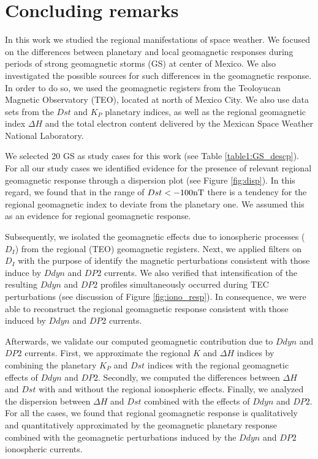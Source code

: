\documentclass[a4paper,fleqn]{cas-dc}
\begin{document}
\section{Concluding remarks}

In this work we studied the regional manifestations of space weather. We focused on the differences between planetary and local geomagnetic responses during periods of strong geomagnetic storms (GS) at center of Mexico. We also investigated the possible sources for such differences in the geomagnetic response. In order to do so, we used the geomagnetic registers from the Teoloyucan Magnetic Observatory (TEO), located at north of Mexico City. We also use data sets from the $Dst$ and $K_P$ planetary indices, as well as the regional geomagnetic index $\Delta H$ and the total electron content delivered by the Mexican Space Weather National Laboratory.

We selected 20 GS as study cases for this work (see Table \ref{table1:GS_descp}). For all our study cases we identified evidence for the presence of relevant regional geomagnetic response through a dispersion plot (see Figure \ref{fig:disp}). In this regard, we found that in the range of $Dst < -100 {\rm nT}$ there is a tendency for the regional geomagnetic index to deviate from the planetary one. We assumed this as an evidence for regional geomagnetic response.

Subsequently, we isolated the geomagnetic effects due to ionospheric processes ($D_I$) from the regional (TEO) geomagnetic registers. Next, we applied filters on $D_I$ with the purpose of identify the magnetic perturbations consistent with those induce by $Ddyn$ and $DP2$ currents. We also verified that intensification of the resulting $Ddyn$ and $DP2$ profiles simultaneously occurred during TEC perturbations (see discussion of Figure \ref{fig:iono_resp}). In consequence, we were able to reconstruct the regional geomagnetic response consistent with those induced by $Ddyn$ and $DP2$ currents.

Afterwards, we validate our computed geomagnetic contribution due to $Ddyn$ and $DP2$ currents. First, we approximate the regional $K$ and $\Delta H$ indices by combining the planetary $K_P$ and $Dst$ indices with the regional geomagnetic effects of $Ddyn$ and $DP2$. Secondly, we computed the differences between $\Delta H$ and $Dst$ with and without the regional ionospheric effects. Finally, we analyzed the dispersion between $\Delta H$ and $Dst$ combined with the effects of $Ddyn$ and $DP2$. For all the cases, we found that regional geomagnetic response is qualitatively and quantitatively approximated by the geomagnetic planetary response combined with the geomagnetic perturbations induced by the $Ddyn$ and $DP2$ ionospheric currents. 
\end{document}
